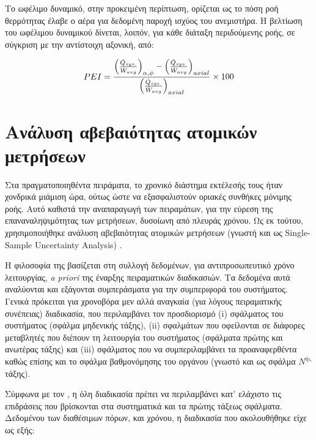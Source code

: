 \noindent Το ωφέλιμο δυναμικό, στην προκειμένη περίπτωση, ορίζεται ως το πόση ροή θερμότητας έλαβε ο αέρα για δεδομένη παροχή ισχύος του ανεμιστήρα. Η βελτίωση του ωφέλιμου δυναμικού δίνεται, λοιπόν, για κάθε διάταξη περιδούμενης ροής, σε σύγκριση με την αντίστοιχη αξονική, από:  
 
\begin{equation}\label{eq:pei}
PEI = \displaystyle\frac{\left( \frac{\dot{Q}_{sys.}}{\dot{W}_{\scriptsize{avg}}} \right)_{\alpha, \phi} - \left( \frac{\dot{Q}_{sys.}}{\dot{W}_{\scriptsize{avg}}} \right)_{axial}}{\left( \frac{\dot{Q}_{sys.}}{\dot{W}_{\scriptsize{avg}}} \right)_{axial}} \times 100
\end{equation}  
 
\section{Ανάλυση αβεβαιότητας ατομικών μετρήσεων}\label{uncertaintyofmeasurements}

\noindent Στα πραγματοποιηθέντα πειράματα, το χρονικό διάστημα εκτέλεσής τους ήταν χονδρικά μιάμιση ώρα, ούτως ώστε να εξασφαλιστούν οριακές συνθήκες μόνιμης ροής. Αυτό καθιστά την αναπαραγωγή των πειραμάτων, για την εύρεση της επαναναληψιμότητας των μετρήσεων, δυσοίωνη από πλευράς χρόνου. Ως εκ τούτου, χρησιμοποιήθηκε ανάλυση αβεβαιότητας ατομικών μετρήσεων (γνωστή και ως Single-Sample Uncertainty Analysis) \cite{1988_Moffat}.

Η φιλοσοφία της βασίζεται στη συλλογή δεδομένων, για αντιπροσωπευτικό χρόνο λειτουργίας, \textit{a priori} της έναρξης πειραματικών διαδικασιών. Τα δεδομένα αυτά αναλύονται και εξάγονται συμπεράσματα για την συμπεριφορά του συστήματος. Γενικά πρόκειται για χρονοβόρα μεν αλλά αναγκαία (για λόγους πειραματικής συνέπειας) διαδικασία, που περιλαμβάνει τον προσδιορισμό (i) σφάλματος του συστήματος (σφάλμα μηδενικής τάξης), (ii) σφαλμάτων που οφείλονται σε διάφορες μεταβλητές που διέπουν τη λειτουργία του συστήματος (σφάλματα πρώτης και ανωτέρας τάξης) και (iii) σφάλματος που να συμπεριλαμβάνει τα προαναφερθέντα καθώς επίσης και το σφάλμα βαθμονόμησης του οργάνου (γνωστό και ως σφάλμα $N^{\text{ής}}$ τάξης).

Σύμφωνα με τον \citeauthor{1988_Moffat} \cite{1988_Moffat}, η όλη διαδικασία πρέπει να περιλαμβάνει κατ' ελάχιστο τις επιδράσεις που βρίσκονται στα συστηματικά και τα πρώτης τάξεως σφάλματα. Δεδομένου των διαθέσιμων πόρων, και χρόνου, η διαδικασία που ακολουθήθηκε είχε ως εξής:

